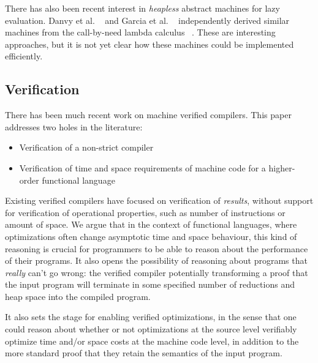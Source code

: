 There has also been recent interest in \emph{heapless} abstract
machines for lazy evaluation. Danvy et al. ~\cite{danvy2012inter} and
Garcia et al. ~\cite{garcia2009lazy} independently derived similar
machines from the call-by-need lambda calculus
~\cite{ariola1995call}. These are interesting approaches, but it is not yet
clear how these machines could be implemented efficiently.

\subsection{Verification}
There has been much recent work on machine verified compilers. This paper
addresses two holes in the literature: 

\begin{itemize}
\item Verification of a non-strict compiler
\item Verification of time and space requirements of machine code for a
higher-order functional language
\end{itemize}

Existing verified compilers have focused on verification of \emph{results},
without support for verification of operational properties, such as number of
instructions or amount of space. We argue that in the context of functional
languages, where optimizations often change asymptotic time and space behaviour,
this kind of reasoning is crucial for programmers to be able to reason about the
performance of their programs. It also opens the possibility of reasoning about
programs that \emph{really} can't go wrong: the verified compiler potentially
transforming a proof that the input program will terminate in some specified
number of reductions and heap space into the compiled program.

It also sets the stage for enabling verified optimizations, in the sense that
one could reason about whether or not optimizations at the source level
verifiably optimize time and/or space costs at the machine code level, in
addition to the more standard proof that they retain the semantics of the input
program. 


